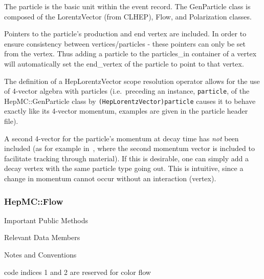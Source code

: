 \documentclass[11pt,letterpaper]{article}
\begin{document}
The particle is the basic unit within the event record. The GenParticle
class is composed of the LorentzVector (from CLHEP), Flow, and
Polarization classes. 

Pointers to the particle's production and end vertex are included. In
order to ensure consistency between vertices/particles - these
pointers can only be set from the vertex. Thus adding a particle to
the particles\_in container of a vertex will automatically set the
end\_vertex of the particle to point to that vertex. 

The definition of a HepLorentzVector scope resolution operator allows
for the use of 4-vector algebra with particles (i.e.\ preceding an
instance, \verb!particle!, of the HepMC::GenParticle class by
\verb!(HepLorentzVector)particle!  causes it to behave exactly like
its 4-vector momentum, examples are given in the particle header file).

A second 4-vector for the particle's momentum at decay time has 
{\it not} been included (as for example in~\cite{mc++}, where the
second momentum vector is included to facilitate tracking through
material). If this is desirable, one can simply add a decay vertex
with the same particle type going out. This is intuitive, since a
change in momentum cannot occur without an interaction (vertex).

%
%

\subsubsection{HepMC::Flow}
\begin{myitemize}{Important Public Methods}
\end{myitemize}
\begin{myitemize}{Relevant Data Members}
\end{myitemize}
\begin{myitemize}{Notes and Conventions}
  \item code indices 1 and 2 are reserved for color flow
\end{myitemize}
\end{document}
